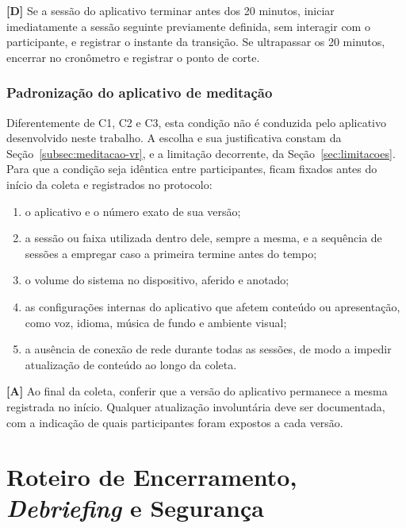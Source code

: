 \noindent\textbf{[D]} Se a sessão do aplicativo terminar antes dos 20 minutos, iniciar imediatamente a sessão seguinte previamente definida, sem interagir com o participante, e registrar o instante da transição. Se ultrapassar os 20 minutos, encerrar no cronômetro e registrar o ponto de corte.

\subsection*{Padronização do aplicativo de meditação}

Diferentemente de C1, C2 e C3, esta condição não é conduzida pelo aplicativo desenvolvido neste trabalho. A escolha e sua justificativa constam da Seção~\ref{subsec:meditacao-vr}, e a limitação decorrente, da Seção~\ref{sec:limitacoes}. Para que a condição seja idêntica entre participantes, ficam fixados antes do início da coleta e registrados no protocolo:

\begin{enumerate}[label=\alph*)]
    \item o aplicativo e o número exato de sua versão;
    \item a sessão ou faixa utilizada dentro dele, sempre a mesma, e a sequência de sessões a empregar caso a primeira termine antes do tempo;
    \item o volume do sistema no dispositivo, aferido e anotado;
    \item as configurações internas do aplicativo que afetem conteúdo ou apresentação, como voz, idioma, música de fundo e ambiente visual;
    \item a ausência de conexão de rede durante todas as sessões, de modo a impedir atualização de conteúdo ao longo da coleta.
\end{enumerate}

\noindent\textbf{[A]} Ao final da coleta, conferir que a versão do aplicativo permanece a mesma registrada no início. Qualquer atualização involuntária deve ser documentada, com a indicação de quais participantes foram expostos a cada versão.


\chapter{Roteiro de Encerramento, \textit{Debriefing} e Segurança}\label{ap:encerramento}

